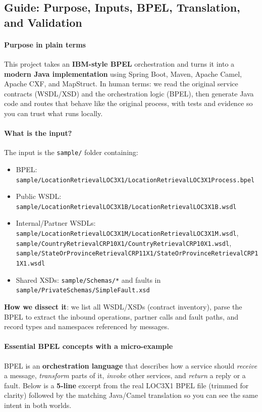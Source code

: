 \documentclass[11pt,a4paper]{article}
\begin{document}
\subsection{Guide: Purpose, Inputs, BPEL, Translation, and Validation}\label{sec:beginner-guide}
\paragraph*{Purpose in plain terms}
This project takes an \textbf{IBM-style BPEL} orchestration and turns it into a \textbf{modern Java implementation} using Spring Boot, Maven, Apache Camel, Apache CXF, and MapStruct. In human terms: we read the original service contracts (WSDL/XSD) and the orchestration logic (BPEL), then generate Java code and routes that behave like the original process, with tests and evidence so you can trust what runs locally.

\paragraph*{What is the input?}
The input is the \texttt{sample/} folder containing:
\begin{itemize}
  \item BPEL: \texttt{sample/LocationRetrievalLOC3X1/LocationRetrievalLOC3X1Process.bpel}
  \item Public WSDL: \texttt{sample/LocationRetrievalLOC3X1B/LocationRetrievalLOC3X1B.wsdl}
  \item Internal/Partner WSDLs: \texttt{sample/LocationRetrievalLOC3X1M/LocationRetrievalLOC3X1M.wsdl}, \texttt{sample/CountryRetrievalCRP10X1/CountryRetrievalCRP10X1.wsdl}, \texttt{sample/StateOrProvinceRetrievalCRP11X1/StateOrProvinceRetrievalCRP11X1.wsdl}
  \item Shared XSDs: \texttt{sample/Schemas/*} and faults in \texttt{sample/PrivateSchemas/SimpleFault.xsd}
\end{itemize}
\textbf{How we dissect it}: we list all WSDL/XSDs (contract inventory), parse the BPEL to extract the inbound operations, partner calls and fault paths, and record types and namespaces referenced by messages.

\paragraph*{Essential BPEL concepts with a micro-example}
BPEL is an \textbf{orchestration language} that describes how a service should \textit{receive} a message, \textit{transform} parts of it, \textit{invoke} other services, and \textit{return} a reply or a fault.  
Below is a \textbf{5-line} excerpt from the real LOC3X1 BPEL file (trimmed for clarity) followed by the matching Java/Camel translation so you can see the same intent in both worlds.
\end{document}
